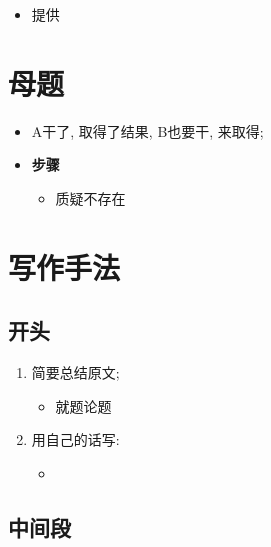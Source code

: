     \begin{itemize}
      \item 提供
    \end{itemize}

\section{母题}

  \begin{itemize}
    \item A干了, 取得了结果, B也要干, 来取得;
    \item \textbf{步骤}
    \begin{itemize}
      \item 质疑不存在
    \end{itemize}
  \end{itemize}

\section{写作手法}

  \subsection{开头}

    \begin{enumerate}
      \item 简要总结原文;
      \begin{itemize}
        \item 就题论题
      \end{itemize}

      \item 用自己的话写: 
      \begin{itemize}
        \item {}
      \end{itemize}
    \end{enumerate}

  \subsection{中间段}

